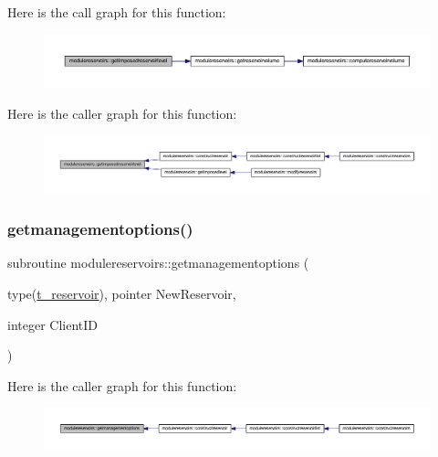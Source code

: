 Here is the call graph for this function\+:\nopagebreak
\begin{figure}[H]
\begin{center}
\leavevmode
\includegraphics[width=350pt]{namespacemodulereservoirs_a22d1b1d83488cecbdcf52565d3aa4e99_cgraph}
\end{center}
\end{figure}
Here is the caller graph for this function\+:\nopagebreak
\begin{figure}[H]
\begin{center}
\leavevmode
\includegraphics[width=350pt]{namespacemodulereservoirs_a22d1b1d83488cecbdcf52565d3aa4e99_icgraph}
\end{center}
\end{figure}
\mbox{\label{namespacemodulereservoirs_aa1e3cf305f3f33775d706fde19afd2c6}} 
\subsubsection{\texorpdfstring{getmanagementoptions()}{getmanagementoptions()}}
{\footnotesize\ttfamily subroutine modulereservoirs\+::getmanagementoptions (\begin{DoxyParamCaption}\item[{type(\mbox{\hyperlink{structmodulereservoirs_1_1t__reservoir}{t\+\_\+reservoir}}), pointer}]{New\+Reservoir,  }\item[{integer}]{Client\+ID }\end{DoxyParamCaption})\hspace{0.3cm}{\ttfamily [private]}}

Here is the caller graph for this function\+:\nopagebreak
\begin{figure}[H]
\begin{center}
\leavevmode
\includegraphics[width=350pt]{namespacemodulereservoirs_aa1e3cf305f3f33775d706fde19afd2c6_icgraph}
\end{center}
\end{figure}
\mbox{\label{namespacemodulereservoirs_a6c97c189244107e76016a8e045715d94}} 
